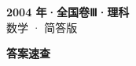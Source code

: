 \documentclass[zihao=-4, a4paper]{ctexart}
\begin{document}
\begin{center}
  {\Large\bfseries 2004 年·全国卷Ⅲ·理科}\\[4pt]
  {\large 数学 · 简答版}
\end{center}
\medskip
{}

\clearpage
{}
\begin{center}{\Large\bfseries 答案速查}\end{center}
\medskip

\end{document}
